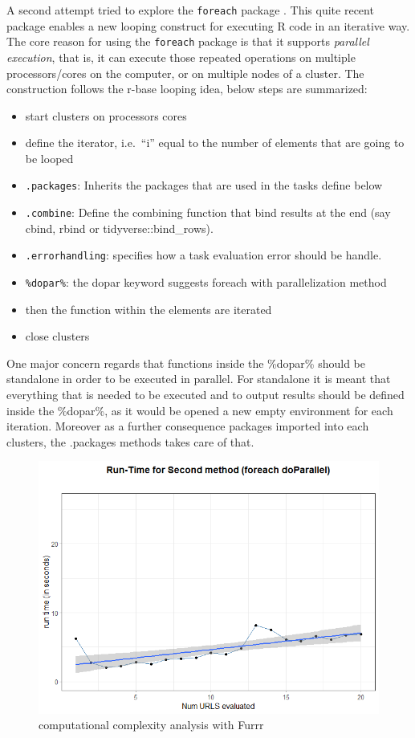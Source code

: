 \documentclass[
  12pt,
  a4paper,
  oneside]{book}
\providecommand{\tightlist}{%
  \setlength{\itemsep}{0pt}\setlength{\parskip}{0pt}}
\begin{document}
A second attempt tried to explore the \texttt{foreach} package \citep{foreach}. This quite recent package enables a new looping construct for executing R code in an iterative way. The core reason for using the \texttt{foreach} package is that it supports \emph{parallel execution}, that is, it can execute those repeated operations on multiple processors/cores on the computer, or on multiple nodes of a cluster. The construction follows the r-base looping idea, below steps are summarized:

\begin{itemize}
\tightlist
\item
  start clusters on processors cores
\item
  define the iterator, i.e.~``i'' equal to the number of elements that are going to be looped
\item
  \texttt{.packages}: Inherits the packages that are used in the tasks define below
\item
  \texttt{.combine}: Define the combining function that bind results at the end (say cbind, rbind or tidyverse::bind\_rows).
\item
  \texttt{.errorhandling}: specifies how a task evaluation error should be handle.
\item
  \texttt{\%dopar\%}: the dopar keyword suggests foreach with parallelization method
\item
  then the function within the elements are iterated
\item
  close clusters
\end{itemize}

One major concern regards that functions inside the \%dopar\% should be standalone in order to be executed in parallel. For standalone it is meant that everything that is needed to be executed and to output results should be defined inside the \%dopar\%, as it would be opened a new empty environment for each iteration. Moreover as a further consequence packages imported into each clusters, the .packages methods takes care of that.

\begin{figure}
\centering
\includegraphics{images/run_timeforeach.png}
\caption{computational complexity analysis with Furrr}
\end{figure}
\end{document}
